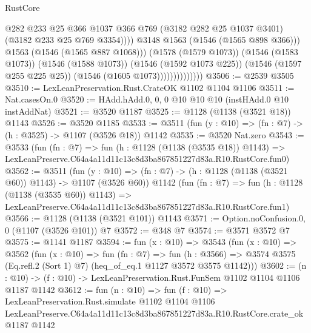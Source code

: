 \begin{lexlean}{RustCore}
\begin{coremodule}
                                      @282
                                      @233
                                      @25
                                      @366
                                      @1037
                                      @366
                                      @769
                                      (@3182 @282 @25 @1037 @3401)
                                      (@3182 @233 @25 @769 @3354))))
                                @3148
                                @1563
                                (@1546 (@1565 @898 @366)))
                              @1563
                              (@1546 (@1565 @887 @1068)))
                            (@1578 (@1579 @1073))
                            (@1546 (@1583 @1073))
                            (@1546 (@1588 @1073))
                            (@1546 (@1592 @1073 @225))
                            (@1546 (@1597 @255 @225 @25))
                            (@1546 (@1605 @1073))))))))))))))
@3506 := @2539 @3505
@3510 := LexLeanPreservation.Rust.CrateOK @1102 @1104 @1106
@3511 := Nat.casesOn.{0}
@3520 := HAdd.hAdd.{0, 0, 0} @10 @10 @10 (instHAdd.{0} @10 instAddNat)
@3521 := @3520 @1187
@3525 := @1128 (@1138 (@3521 @18)) @1143
@3526 := @3520 @1185
@3533 := @3511 (fun (y : @10) => (fn : @7) -> (h : @3525) -> @1107 (@3526 @18)) @1142
@3535 := @3520 Nat.zero
@3543 := @3533
    (fun (fn : @7) =>
    fun (h : @1128 (@1138 (@3535 @18)) @1143) =>
    LexLeanPreserve.C64a4a11d11c13c8d3ba867851227d83a.R10.RustCore.fun0)
@3562 := @3511
    (fun (y : @10) => (fn : @7) -> (h : @1128 (@1138 (@3521 @60)) @1143) -> @1107 (@3526 @60))
    @1142
    (fun (fn : @7) =>
    fun (h : @1128 (@1138 (@3535 @60)) @1143) =>
    LexLeanPreserve.C64a4a11d11c13c8d3ba867851227d83a.R10.RustCore.fun1)
@3566 := @1128 (@1138 (@3521 @101)) @1143
@3571 := Option.noConfusion.{0, 0} (@1107 (@3526 @101)) @7
@3572 := @348 @7
@3574 := @3571 @3572 @7
@3575 := @1141 @1187
@3594 := fun (x : @10) =>
  @3543
    (fun (x : @10) =>
    @3562
      (fun (x : @10) =>
      fun (fn : @7) =>
      fun (h : @3566) =>
      @3574 @3575 (Eq.refl.{2} (Sort 1) @7) (heq_of_eq.{1} @1127 @3572 @3575 @1142)))
@3602 := (n : @10) -> (f : @10) -> LexLeanPreservation.Rust.FunSem @1102 @1104 @1106 @1187 @1142
@3612 := fun (n : @10) =>
  fun (f : @10) =>
  LexLeanPreservation.Rust.simulate
    @1102
    @1104
    @1106
    LexLeanPreserve.C64a4a11d11c13c8d3ba867851227d83a.R10.RustCore.crate_ok
    @1187
    @1142
\end{coremodule}
\end{lexlean}
